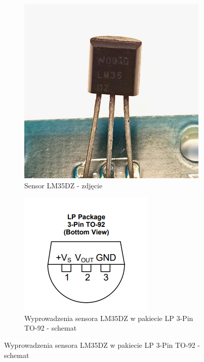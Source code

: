 \documentclass[11pt, a4paper]{article}
\begin{document}
\begin{figure}[h]
\centering
\begin{subfigure}{.5\textwidth}
\centering
\includegraphics[width=.7\linewidth]{fig/LM35DZ/lm35dz_zdjecie.jpg}
\caption{Sensor LM35DZ - zdjęcie}
\label{fig:_zdjecie_elementu}
\end{subfigure}%
\begin{subfigure}{.5\textwidth}
\centering
\includegraphics[width=.7\linewidth]{fig/LM35DZ/lm35_lp_schemat.PNG}
\caption{\centering Wyprowadzenia sensora LM35DZ w pakiecie LP 3-Pin TO-92 - schemat}
\label{fig:_zasada_dzialania_elementu}
\end{subfigure}
\label{fig:element}
\end{figure}
\end{document}
